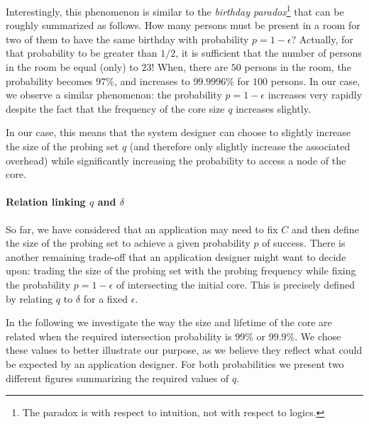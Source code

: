 \documentclass[]{llncs}
\begin{document}
Interestingly,  this phenomenon  is similar to the {\it birthday
paradox}\footnote{The  paradox  is  with  respect  to  intuition,  not  with
respect to logics.} \cite{I95} that can be roughly summarized as follows.  
How many persons must be present in a room for two of them
to have the same birthday with probability $p=1-\epsilon$? 
Actually, for  that probability to  be greater than $1/2$, it is sufficient
that the number of persons in the room  be equal (only) to  $23$! 
When, there are $50$ persons  in the  room, the probability becomes $97\%$,
and  increases to $99.9996\%$ for $100$ persons. 
In  our  case, we observe a similar phenomenon: 
the  probability $p=1-\epsilon$  increases  very rapidly despite the fact
that  the frequency of the core size $q$ increases slightly.


In our case, this means that  the system designer 
can choose to slightly increase the size of the probing set $q$ (and 
therefore  only slightly increase the associated overhead)
while significantly increasing the probability to access a node of the core.



\paragraph{Relation linking $q$ and $\delta$}

So far, we have considered that an application may need to fix $C$ and 
then define the size of the probing set to achieve a given probability $p$ of 
success. There is another remaining trade-off that an application designer
might want to decide upon:  trading the size of the probing set with the
probing frequency while fixing the probability $p=1-\epsilon$
of intersecting the initial core. This is precisely defined by relating 
$q$ to $\delta$ for a fixed $\epsilon$.

In the following we investigate the way the size and lifetime of the core
are related when the required intersection probability is 
$99\%$ or  $99.9\%$.  We chose these values to better illustrate our purpose,
as we believe they reflect what could be expected by an application
designer.  For both  probabilities we present two different figures summarizing
the required  values of  $q$. 
\end{document}
